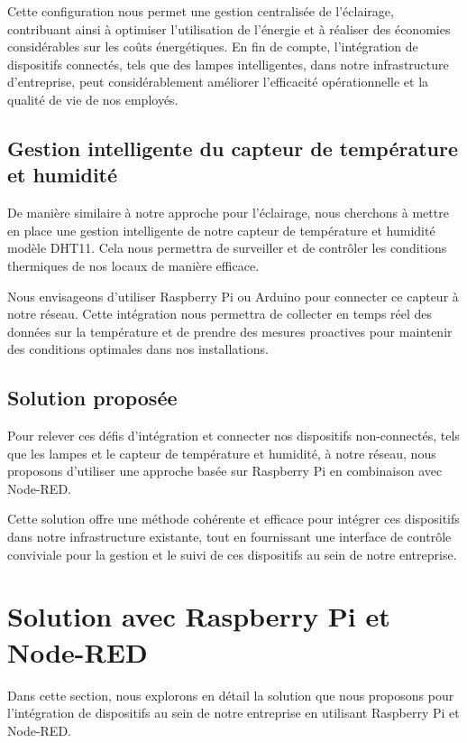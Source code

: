 Cette configuration nous permet une gestion centralisée de l'éclairage, contribuant ainsi à optimiser l'utilisation de l'énergie et à réaliser des économies considérables sur les coûts énergétiques. En fin de compte, l'intégration de dispositifs connectés, tels que des lampes intelligentes, dans notre infrastructure d'entreprise, peut considérablement améliorer l'efficacité opérationnelle et la qualité de vie de nos employés.

\subsection{Gestion intelligente du capteur de température et humidité}

De manière similaire à notre approche pour l'éclairage, nous cherchons à mettre en place une gestion intelligente de notre capteur de température et humidité modèle DHT11. Cela nous permettra de surveiller et de contrôler les conditions thermiques de nos locaux de manière efficace. 

Nous envisageons d'utiliser Raspberry Pi ou Arduino pour connecter ce capteur à notre réseau. Cette intégration nous permettra de collecter en temps réel des données sur la température et de prendre des mesures proactives pour maintenir des conditions optimales dans nos installations.


\subsection{Solution proposée}

Pour relever ces défis d'intégration et connecter nos dispositifs non-connectés, tels que les lampes et le capteur de température et humidité, à notre réseau, nous proposons d'utiliser une approche basée sur Raspberry Pi en combinaison avec Node-RED. 

Cette solution offre une méthode cohérente et efficace pour intégrer ces dispositifs dans notre infrastructure existante, tout en fournissant une interface de contrôle conviviale pour la gestion et le suivi de ces dispositifs au sein de notre entreprise.




\section{Solution avec Raspberry Pi et Node-RED}

Dans cette section, nous explorons en détail la solution que nous proposons pour l'intégration de dispositifs au sein de notre entreprise en utilisant Raspberry Pi et Node-RED. 

